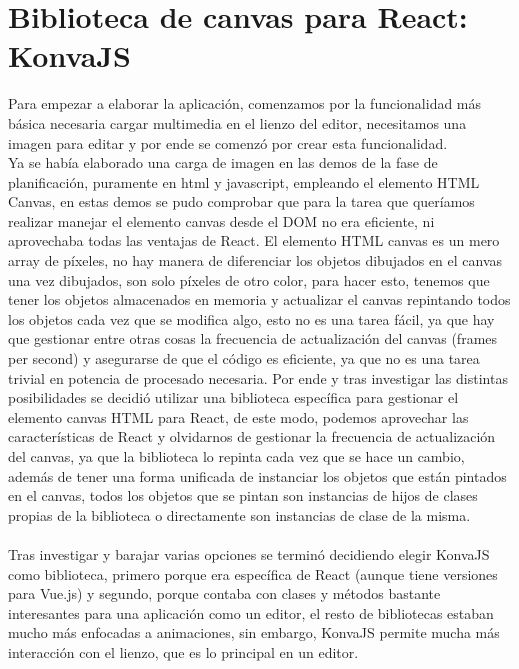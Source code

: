 \section{Biblioteca de canvas para React: KonvaJS}
Para empezar a elaborar la aplicación, comenzamos por la funcionalidad más básica necesaria
cargar multimedia en el lienzo del editor, necesitamos una imagen para editar y por
ende se comenzó por crear esta funcionalidad.
\\
Ya se había elaborado una carga de imagen en las demos de la fase de planificación, 
puramente en html y javascript, empleando el elemento HTML Canvas, en estas demos 
se pudo comprobar que para la tarea que queríamos realizar manejar el elemento
canvas desde el DOM\cite{DOM} no era eficiente, ni aprovechaba todas las ventajas 
de React.
El elemento HTML canvas es un mero array de píxeles, no hay manera de diferenciar 
los objetos dibujados en el canvas una vez dibujados, son solo píxeles de otro color,
para hacer esto, tenemos que tener los objetos almacenados en memoria y actualizar el
canvas repintando todos los objetos cada vez que se modifica algo, esto no es una 
tarea fácil, ya que hay que gestionar entre otras cosas la frecuencia de actualización
del canvas (frames per second) y asegurarse de que el código es eficiente, ya que 
no es una tarea trivial en potencia de procesado necesaria.
Por ende y tras investigar las distintas posibilidades se decidió utilizar una 
biblioteca específica para gestionar el elemento canvas HTML para React, de este
modo, podemos aprovechar las características de React y olvidarnos de gestionar 
la frecuencia de actualización del canvas, ya que la biblioteca lo repinta cada vez
que se hace un cambio, además de tener una forma unificada de instanciar los objetos
que están pintados en el canvas, todos los objetos que se pintan son instancias de 
hijos de clases propias de la biblioteca o directamente son instancias de clase de la 
misma.
\\\\
Tras investigar y barajar varias opciones se terminó decidiendo elegir KonvaJS 
\cite{KonvaJS} como biblioteca, primero porque era específica de React
(aunque tiene versiones para Vue.js) 
y segundo, porque contaba con clases y métodos bastante interesantes para una aplicación
como un editor, el resto de bibliotecas estaban mucho más enfocadas a animaciones, sin 
embargo, KonvaJS permite mucha más interacción con el lienzo, que es lo principal en un
editor.
